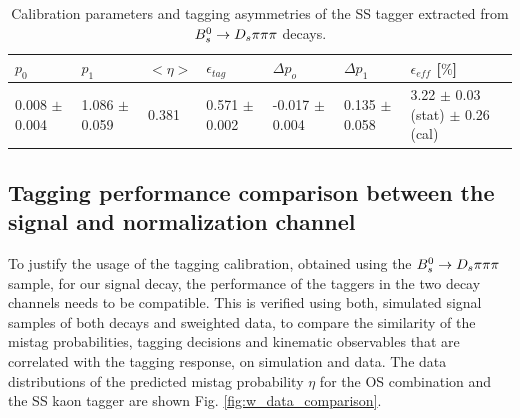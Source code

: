 \begin{table}[h]
\centering
\scriptsize
 \begin{tabular}{l l l l | l l | l}
\hline
$p_{0}$ & $p_{1}$ & $<\eta>$ & $\epsilon_{tag}$ & $\Delta p_{o}$ & $\Delta p_{1}$ & $\epsilon_{eff}$ [$\%$] \\
\hline
0.008 $\pm$ 0.004  & 1.086 $\pm$ 0.059 & 0.381 & 0.571 $\pm$ 0.002 & -0.017 $\pm$ 0.004  & 0.135 $\pm$ 0.058 & 3.22 $\pm$ 0.03 (stat) $\pm$ 0.26 (cal) \\
\hline
\end{tabular}
\caption{Calibration parameters and tagging asymmetries of the SS tagger extracted from ${{B}^0_{s}}\rightarrow{\ensuremath{{D}_{s}}}{\ensuremath{\pi}}{\ensuremath{\pi}}{\ensuremath{\pi}}$ decays.}
\label{table: SScalibration}
\normalsize
\end{table}


\subsection{Tagging performance comparison between the signal and normalization channel}
\label{subsec: TaggingComparison}

To justify the usage of the tagging calibration, obtained using the ${{B}^0_{s}}\rightarrow{\ensuremath{{D}_{s}}}{\ensuremath{\pi}}{\ensuremath{\pi}}{\ensuremath{\pi}}$ sample, for our signal decay, the performance of the taggers in the two decay channels needs to be compatible. 
This is verified using both, simulated signal samples of both decays and sweighted data, 
to compare the similarity of the mistag probabilities, tagging decisions and kinematic observables that are correlated with the tagging response, on simulation and data.  \newline
The data distributions of the predicted mistag probability $\eta$ for the OS combination and the SS kaon tagger are shown  Fig. \ref{fig:w_data_comparison}.
 


